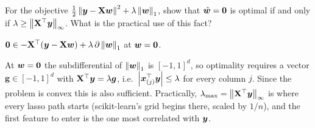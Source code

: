 \begin{problem}
	\threechili
	For the objective $\frac12\left\lVert {\bm{y}}-{\mathbf{X}}{\bm{w}} \right\rVert^2+\lambda\left\lVert {\bm{w}} \right\rVert_1$, show that $\hat{{\bm{w}}}={\bm{0}}$ is optimal
	if and only if $\lambda\ge\left\lVert {\mathbf{X}}^{\top}{\bm{y}} \right\rVert_\infty$. What is the practical use of this fact?
	\begin{hint}
		${\bm{0}}\in-{\mathbf{X}}^{\top}({\bm{y}}-{\mathbf{X}}{\bm{w}})+\lambda\,\partial\left\lVert {\bm{w}} \right\rVert_1$ at ${\bm{w}}={\bm{0}}$.
	\end{hint}
	\begin{sol}
		At ${\bm{w}}={\bm{0}}$ the subdifferential of $\left\lVert {\bm{w}} \right\rVert_1$ is $[-1,1]^d$, so optimality requires a
		vector $\bm g\in[-1,1]^d$ with ${\mathbf{X}}^{\top}{\bm{y}}=\lambda\bm g$, i.e.\ $\left\lvert {\bm{x}}_{(j)}^{\top}{\bm{y}} \right\rvert\le\lambda$ for
		every column $j$. Since the problem is convex this is also sufficient. Practically,
		$\lambda_{\max}=\left\lVert {\mathbf{X}}^{\top}{\bm{y}} \right\rVert_\infty$ is where every lasso path starts (scikit-learn's grid
		begins there, scaled by $1/n$), and the first feature to enter is the one most correlated
		with ${\bm{y}}$.
	\end{sol}
\end{problem}
